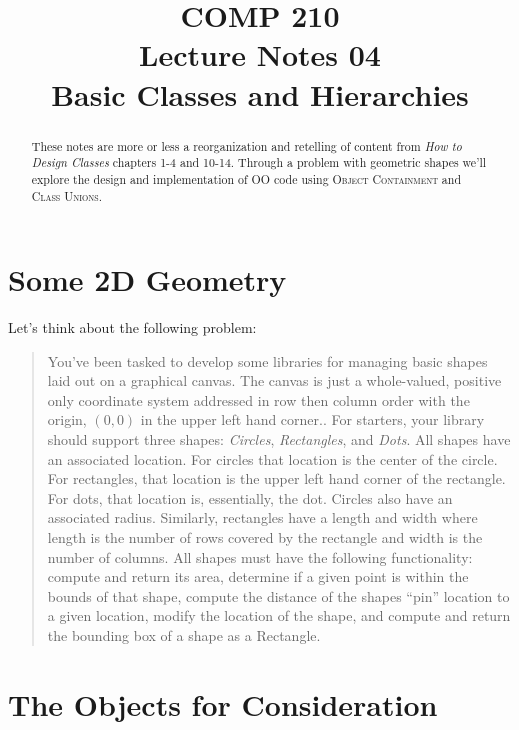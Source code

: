 \documentclass[nobib]{tufte-handout}
\title{COMP 210 \\ Lecture Notes 04 \\ Basic Classes and Hierarchies}
\begin{document}
\maketitle

\begin{abstract}
These notes are more or less a reorganization and retelling of content from \textit{How to Design Classes} chapters 1-4 and 10-14. Through a problem with geometric shapes we'll explore the design and implementation of OO code using \textsc{Object Containment} and \textsc{Class Unions}.
\end{abstract}

\section{Some 2D Geometry}

Let's think about the following problem:
\begin{quote}
You've been tasked to develop some libraries for managing basic shapes laid out on a graphical canvas. The canvas is just a whole-valued, positive only coordinate system addressed in row then column order with the origin, $(0,0)$ in the upper left hand corner.. For starters, your library should support three shapes: \textit{Circles}, \textit{Rectangles}, and \textit{Dots}. All shapes have an associated location. For circles that location is the center of the circle. For rectangles, that location is the upper left hand corner of the rectangle. For dots, that location is, essentially, the dot. Circles also have an associated radius. Similarly, rectangles have a length and width where length is the number of rows covered by the rectangle and width is the number of columns.
All shapes must have the following functionality: compute and return its area, determine if a given point is within the bounds of that shape, compute the distance of the shapes ``pin'' location to a given location, modify the location of the shape, and compute and return the bounding box of a shape as a Rectangle.
\end{quote}

\section{The Objects for Consideration}
\end{document}
